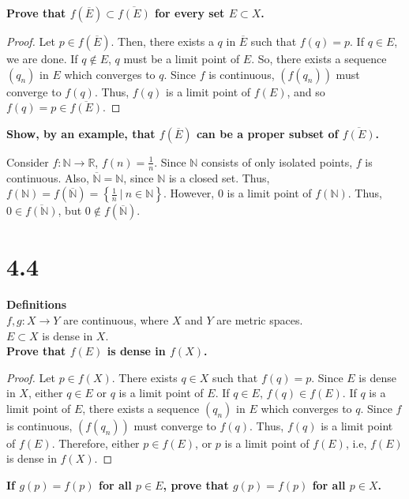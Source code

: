 \documentclass[12pt]{article}
\begin{document}
{\bf Prove that $f(\overline{E})\subset\overline{f(E)}$ for every set $E\subset X$. }


\begin{proof}
      Let $p \in f(\overline{E})$. Then, there exists a 
      $q$ in $\overline{E}$ such that $f(q)=p$. If $q\in E$, we are 
      done. If $q\not\in E$, $q$ must be a limit point of $E$. So, there 
      exists a sequence $(q_{n})$ in $E$ which converges to $q$. Since 
      $f$ is continuous, $(f(q_{n}))$ must converge to $f(q)$. Thus, 
      $f(q)$ is a limit point of $f(E)$, and so $f(q)=p\in \overline{f(E)}$. 
\end{proof}

{\bf Show, by an example, that $f(\overline E)$ can be a proper subset of $\overline{f(E)}$.}

Consider $f:\mathbb{N}\to \mathbb{R}$, $f(n)=\frac{1}{n}$. Since 
$\mathbb{N}$ consists of only isolated points, $f$ is continuous. Also, 
$\overline{\mathbb{N}}=\mathbb{N}$, since $\mathbb{N}$ is a closed set. 
Thus, $f(\mathbb{N})= f(\overline{\mathbb{N}})=\left\{  \frac{1}{n} \ 
| \ n\in \mathbb{N} \right\}$. However, $0$ is a limit point of 
$f(\mathbb{N})$. Thus, $0\in \overline{f(\mathbb{N})}$, but 
$0\not\in f(\overline{\mathbb{N}})$. 

\section{4.4}
{\bf Definitions}\\
$f, g:X\to Y$ are continuous, where $X$ and $Y$ are metric spaces.\\
$E\subset X$ is dense in $X$.\\

{\bf Prove that $f(E)$ is dense in $f(X)$.}

\begin{proof}
      Let $p\in f(X)$. There exists $q\in X$ such that $f(q)=p$. 
      Since $E$ is dense in $X$, either $q\in E$ or $q$ is a limit point 
      of $E$. If $q\in E$, $f(q)\in f(E)$. If $q$ is a limit point of $E$, 
      there exists a sequence $(q_{n})$ in $E$ which converges to $q$. 
      Since $f$ is continuous, $(f(q_{n}))$ must converge to $f(q)$. Thus, 
      $f(q)$ is a limit point of $f(E)$. Therefore, either $p\in f(E)$, or 
      $p$ is a limit point of $f(E)$, i.e, $f(E)$ is dense in $f(X)$. 
\end{proof}

{\bf 
If $g(p)=f(p)$ for all $p\in E$, prove that $g(p)=f(p)$ for all $p\in X$. }
\end{document}

